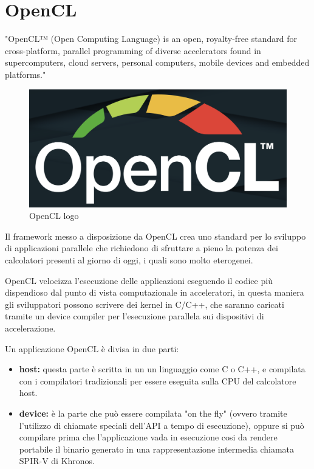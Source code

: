 \section{OpenCL}
\label{Opencl}

"OpenCL™ (Open Computing Language) is an open, royalty-free standard for cross-platform, parallel programming of diverse accelerators found in supercomputers, cloud servers, personal computers, mobile devices and embedded platforms." \cite{sitoOpencl}

\begin{figure}[h!]
    \centering
    \includegraphics[scale=0.2]{images/Capitolo2/4_im.png}
    \caption{OpenCL logo}
    \label{Specifiche-U50}
\end{figure}

Il framework messo a disposizione da OpenCL crea uno standard per lo sviluppo di applicazioni parallele che richiedono di sfruttare a pieno la potenza dei calcolatori presenti al giorno di oggi, i quali sono molto eterogenei.

\vspace{0,3cm}

OpenCL velocizza l'esecuzione delle applicazioni eseguendo il codice più dispendioso dal punto di vista computazionale in acceleratori, in questa maniera gli sviluppatori possono scrivere dei kernel in C/C++, che saranno caricati tramite un device compiler per l'esecuzione parallela sui dispositivi di accelerazione.

\vspace{0,3cm}
\vspace{0,3cm}

\noindent Un applicazione OpenCL è divisa in due parti: 
\begin{itemize}
    \item \textbf{host:} questa parte è scritta in un un linguaggio come C o C++, e compilata con i compilatori tradizionali per essere eseguita sulla CPU del calcolatore host.
    \item \textbf{device:} è la parte che può essere compilata "on the fly" (ovvero tramite l'utilizzo di chiamate speciali dell'API a tempo di esecuzione), oppure si può compilare prima che l'applicazione vada in esecuzione cosi da rendere portabile il binario generato in una rappresentazione intermedia chiamata SPIR-V di Khronos. 
\end{itemize}

